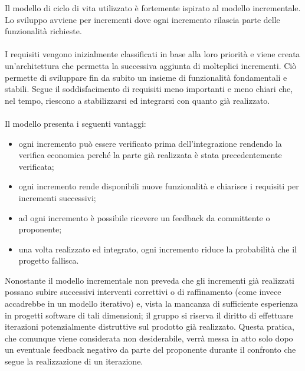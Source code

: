 Il modello di ciclo di vita utilizzato è fortemente ispirato al modello
incrementale. Lo sviluppo avviene per incrementi dove ogni incremento rilascia parte delle funzionalità richieste.
\\\\
I requisiti vengono inizialmente classificati in base alla loro priorità e viene
creata un'architettura che permetta la successiva aggiunta di molteplici
incrementi. Ciò permette di sviluppare fin da subito un insieme di funzionalità
fondamentali e stabili. Segue il soddisfacimento di requisiti meno importanti e
meno chiari che, nel tempo, riescono a stabilizzarsi ed integrarsi con quanto già
realizzato.
\\\\
Il modello presenta i seguenti vantaggi:
\begin{itemize}
    \item ogni incremento può essere verificato prima dell'integrazione rendendo la verifica economica perché la parte già realizzata è stata precedentemente verificata;
    \item ogni incremento rende disponibili nuove funzionalità e chiarisce i requisiti per incrementi successivi;
    \item ad ogni incremento è possibile ricevere un feedback da committente o proponente;
    \item una volta realizzato ed integrato, ogni incremento riduce la probabilità che il progetto fallisca.
\end{itemize}

\noindent
Nonostante il modello incrementale non preveda che gli incrementi già realizzati
possano subire successivi interventi correttivi o di raffinamento (come invece
accadrebbe in un modello iterativo) e, vista la mancanza di sufficiente esperienza
in progetti software di tali dimensioni; il gruppo si riserva il diritto di
effettuare iterazioni potenzialmente distruttive sul prodotto già realizzato.
Questa pratica, che comunque viene considerata non desiderabile, verrà messa in
atto solo dopo un eventuale feedback negativo da parte del proponente durante il
confronto che segue la realizzazione di un iterazione.
